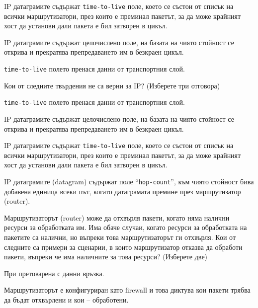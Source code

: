 \begin{questions}
\begin{choices}
    \choice IP датаграмите съдържат
    \texttt{\foreignlanguage{english}{time-to-live}} поле, което се състои от
    списък на всички маршрутизатори, през които е преминал пакетът, за да може
    крайният хост да установи дали пакета е бил затворен в цикъл.

    \CorrectChoice IP датаграмите съдържат целочислено поле, на базата на чиято
    стойност се открива и прекратява препредаването им в безкраен цикъл.

    \choice \texttt{\foreignlanguage{english}{time-to-live}} полето пренася
    данни от транспортния слой.
  \end{choices}

  \question[6] Кои от следните твърдения не са верни за IP? (Изберете три
  отговора)
  \begin{choices}
    \CorrectChoice \texttt{\foreignlanguage{english}{time-to-live}} полето
    пренася данни от транспортния слой.

    \choice IP датаграмите съдържат целочислено поле, на базата на чиято
    стойност се открива и прекратява препредаването им в безкраен цикъл.

    \CorrectChoice IP датаграмите съдържат
    \texttt{\foreignlanguage{english}{time-to-live}} поле, което се състои от
    списък на всички маршрутизатори, през които е преминал пакетът, за да може
    крайният хост да установи дали пакета е бил затворен в цикъл.

    \CorrectChoice IP датаграмите (\foreignlanguage{english}{datagram}) съдържат
    поле "`\texttt{\foreignlanguage{english}{hop-count}}"', към чиято стойност
    бива добавена единица всеки път, когато датаграмата премине през
    маршрутизатор (\foreignlanguage{english}{router}).
  \end{choices}

  \question[6] Маршрутизаторът (\foreignlanguage{english}{router}) може да
  отхвърля пакети, когато няма налични ресурси за обработката им. Има обаче
  случаи, когато ресурси за обработката на пакетите са налични, но въпреки това
  маршрутизаторът ги отхвърля. Кои от следните са примери за сценарии, в които
  маршрутизатор отказва да обработи пакети, въпреки че има наличните за това
  ресурси? (Изберете две)

  \begin{choices}
    \choice При претоварена с данни връзка.

    \CorrectChoice Маршрутизаторът е конфигуриран като
    \foreignlanguage{english}{firewall} и това диктува кои пакети трябва да
    бъдат отхвърлени и кои -- обработени.


\end{choices}
\end{questions}
